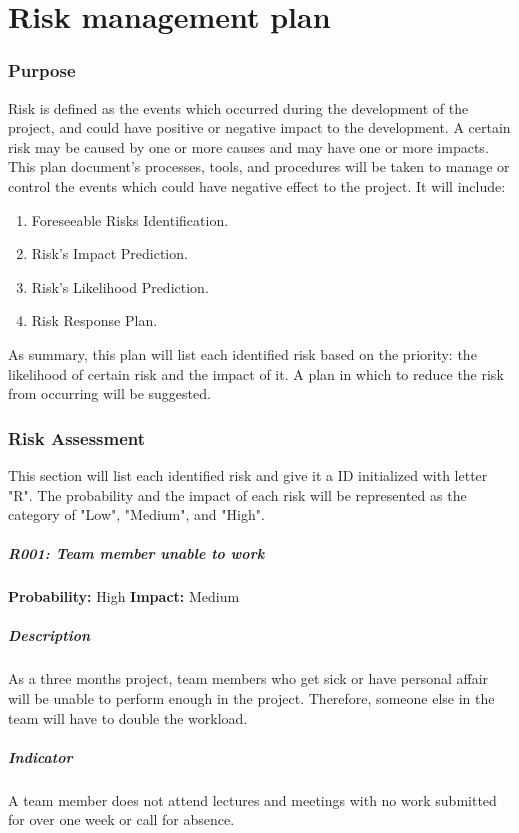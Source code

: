\documentclass[11pt, a4paper]{report}
\begin{document}
\chapter{Risk management plan}
\subsection{Purpose}
Risk is defined as the events which occurred during the development of the project, and could have positive or negative impact to the development. A certain risk may be caused by one or more causes and may have one or more impacts. This plan document's processes, tools, and procedures will be taken to manage or control the events which could have negative effect to the project. It will include:
\begin{enumerate}
	\item Foreseeable Risks Identification.
	\item Risk's Impact Prediction.
	\item Risk's Likelihood Prediction.
	\item Risk Response Plan.
\end{enumerate}
As summary, this plan will list each identified risk based on the priority: the likelihood of certain risk and the impact of it. A plan in which to reduce the risk from occurring will be suggested.

\subsection{Risk Assessment}
This section will list each identified risk and give it a ID initialized with letter "R". The probability and the impact of each risk will be represented as the category of "Low", "Medium", and "High". \\
	\paragraph{R001: Team member unable to work} \hspace{1cm} \textbf{Probability: }High\hspace{1cm}   \textbf{Impact: }Medium
	\paragraph{Description}As a three months project, team members who get sick or have personal affair will be unable to perform enough in the project. Therefore, someone else in the team will have to double the workload.
	\paragraph{Indicator}A team member does not attend lectures and meetings with no work submitted for over one week or call for absence.
\end{document}
